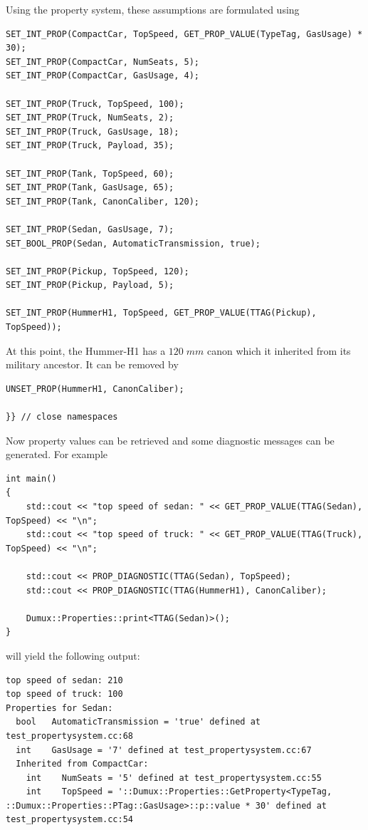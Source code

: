 \noindent
Using the \Dumux property system, these assumptions are formulated
using
\begin{lstlisting}[name=propsyscars,style=DumuxCode]
SET_INT_PROP(CompactCar, TopSpeed, GET_PROP_VALUE(TypeTag, GasUsage) * 30);
SET_INT_PROP(CompactCar, NumSeats, 5);
SET_INT_PROP(CompactCar, GasUsage, 4);

SET_INT_PROP(Truck, TopSpeed, 100);
SET_INT_PROP(Truck, NumSeats, 2);
SET_INT_PROP(Truck, GasUsage, 18);
SET_INT_PROP(Truck, Payload, 35);

SET_INT_PROP(Tank, TopSpeed, 60);
SET_INT_PROP(Tank, GasUsage, 65);
SET_INT_PROP(Tank, CanonCaliber, 120);

SET_INT_PROP(Sedan, GasUsage, 7);
SET_BOOL_PROP(Sedan, AutomaticTransmission, true);

SET_INT_PROP(Pickup, TopSpeed, 120);
SET_INT_PROP(Pickup, Payload, 5);

SET_INT_PROP(HummerH1, TopSpeed, GET_PROP_VALUE(TTAG(Pickup), TopSpeed));
\end{lstlisting}

\noindent
At this point, the Hummer-H1 has a $120\;mm$ canon which it inherited
from its military ancestor. It can be removed by
\begin{lstlisting}[name=propsyscars,style=DumuxCode]
UNSET_PROP(HummerH1, CanonCaliber);

}} // close namespaces
\end{lstlisting}

\noindent
Now property values can be retrieved and some diagnostic messages can
be generated. For example
\begin{lstlisting}[name=propsyscars,style=DumuxCode]
int main()
{
    std::cout << "top speed of sedan: " << GET_PROP_VALUE(TTAG(Sedan), TopSpeed) << "\n";
    std::cout << "top speed of truck: " << GET_PROP_VALUE(TTAG(Truck), TopSpeed) << "\n";

    std::cout << PROP_DIAGNOSTIC(TTAG(Sedan), TopSpeed);
    std::cout << PROP_DIAGNOSTIC(TTAG(HummerH1), CanonCaliber);

    Dumux::Properties::print<TTAG(Sedan)>();
}
\end{lstlisting}
will yield the following output:
\begin{lstlisting}[style=DumuxCode]
top speed of sedan: 210
top speed of truck: 100
Properties for Sedan:
  bool   AutomaticTransmission = 'true' defined at test_propertysystem.cc:68
  int    GasUsage = '7' defined at test_propertysystem.cc:67
  Inherited from CompactCar:
    int    NumSeats = '5' defined at test_propertysystem.cc:55
    int    TopSpeed = '::Dumux::Properties::GetProperty<TypeTag, ::Dumux::Properties::PTag::GasUsage>::p::value * 30' defined at test_propertysystem.cc:54
\end{lstlisting}


